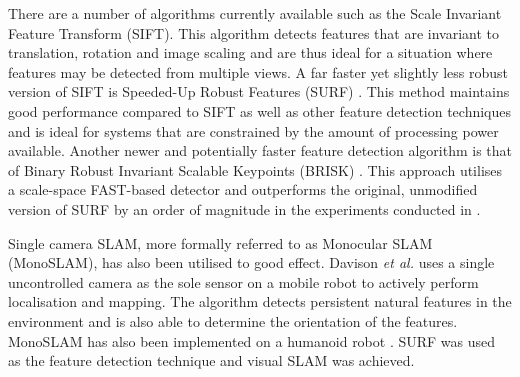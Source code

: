 \documentclass[11pt]{report}
\begin{document}
There are a number of algorithms currently available such as the Scale Invariant Feature Transform (SIFT)\cite{Lowe1999}. This algorithm detects features that are invariant to translation, rotation and image scaling and are thus ideal for a situation where features may be detected from multiple views. A far faster yet slightly less robust version of SIFT is Speeded-Up Robust Features (SURF) \cite{Bay2008}. This method maintains good performance compared to SIFT as well as other feature detection techniques \cite{Juan2009} and is ideal for systems that are constrained by the amount of processing power available. Another newer and potentially faster feature detection algorithm is that of Binary Robust Invariant Scalable Keypoints (BRISK) \cite{Leutenegger}. This approach utilises a scale-space FAST-based detector and outperforms the original, unmodified version of SURF by an order of magnitude in the experiments conducted in \cite{Leutenegger}.
















Single camera SLAM, more formally referred to as Monocular SLAM (MonoSLAM), has also been utilised to good effect. Davison \textit{et al.} \cite{Davison2007} uses a single uncontrolled camera as the sole sensor on a mobile robot to actively perform localisation and mapping. The algorithm detects persistent natural features in the environment and is also able to determine the orientation of the features. MonoSLAM has also been implemented on a humanoid robot \cite{Wang2011}. SURF was used as the feature detection technique and visual SLAM was achieved.\\
\end{document}
